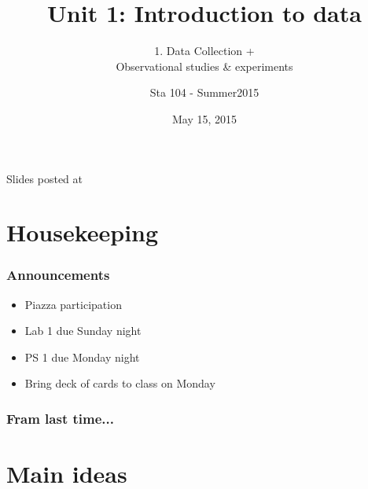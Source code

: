 \documentclass[slidestop,compress,mathserif,12pt,t,professionalfonts,xcolor=table]{beamer}
\title{Unit 1: Introduction to data}
\subtitle{1. Data Collection +\\Observational studies \& experiments}
\author{Sta 104 - Summer2015}
\date{May 15, 2015}
\institute{Duke University, Department of Statistical Science}
\begin{document}



\begin{frame}[plain]

\titlepage
\vfill
{\scriptsize {} \hfill Slides posted at  \webLink{\CourseSite}{\CourseSite}}
\addtocounter{framenumber}{-1} 

\end{frame}


\section{Housekeeping}


\begin{frame}
\frametitle{Announcements}

\begin{itemize}

\item Piazza participation

\item Lab 1 due Sunday night

\item PS 1 due Monday night

\item Bring deck of cards to class on Monday

\end{itemize}

\end{frame}


\begin{frame}
\frametitle{Fram last time...}

\vfill


\vfill

\end{frame}


\section{Main ideas}
\end{document}
